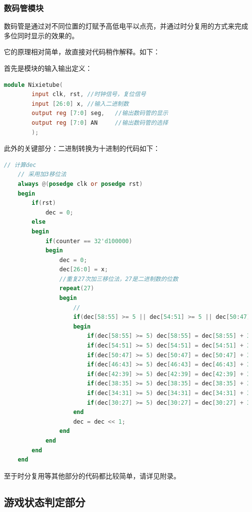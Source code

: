 \documentclass[UTF8]{article}
\begin{document}
	\subsubsection{数码管模块}
	数码管是通过对不同位置的灯赋予高低电平以点亮，并通过时分复用的方式来完成多位同时显示的效果的。\par
	它的原理相对简单，故直接对代码稍作解释。如下：\par
	首先是模块的输入输出定义：\par
	\begin{lstlisting}[language=Verilog]
	module Nixietube(
		input clk, rst, //时钟信号，复位信号
		input [26:0] x, //输入二进制数
		output reg [7:0] seg,   //输出数码管的显示
		output reg [7:0] AN     //输出数码管的选择
		);
	\end{lstlisting}
	此外的关键部分：二进制转换为十进制的代码如下：\par
	\begin{lstlisting}[language=Verilog, name=二进制数转换为十进制]
	// 计算dec
	// 采用加3移位法
	always @(posedge clk or posedge rst)
	begin
		if(rst)
			dec = 0;
		else 
		begin
			if(counter == 32'd100000)
			begin
				dec = 0;
				dec[26:0] = x;
				//重复27次加三移位法，27是二进制数的位数
				repeat(27)
				begin
					//
					if(dec[58:55] >= 5 || dec[54:51] >= 5 || dec[50:47] >= 5 || dec[46:43] >= 5 || dec[42:39] >= 5 || dec[38:35] >= 5 || dec[34:31] >= 5 || dec[30:27] >= 5)
					begin
						if(dec[58:55] >= 5) dec[58:55] = dec[58:55] + 3;
						if(dec[54:51] >= 5) dec[54:51] = dec[54:51] + 3;
						if(dec[50:47] >= 5) dec[50:47] = dec[50:47] + 3;
						if(dec[46:43] >= 5) dec[46:43] = dec[46:43] + 3;
						if(dec[42:39] >= 5) dec[42:39] = dec[42:39] + 3;
						if(dec[38:35] >= 5) dec[38:35] = dec[38:35] + 3;
						if(dec[34:31] >= 5) dec[34:31] = dec[34:31] + 3;
						if(dec[30:27] >= 5) dec[30:27] = dec[30:27] + 3;
					end
					dec = dec << 1;
				end
			end
		end
	end
	\end{lstlisting}
	至于时分复用等其他部分的代码都比较简单，请详见附录。\par
	
	\subsection{游戏状态判定部分}
\end{document}
